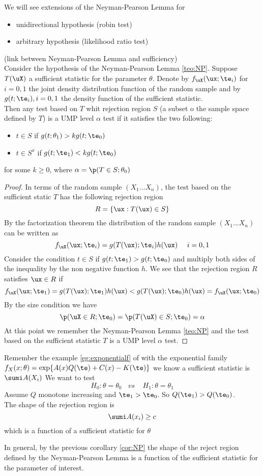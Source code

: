 We will see extensions of the Neyman-Pearson Lemma for
\begin{itemize}
	\item unidirectional hypothesis (robin test)
	\item arbitrary hypothesis (likelihood ratio test)
\end{itemize}
\begin{corol}\label{cor:NP}
	(link between Neyman-Pearson Lemma and sufficiency)\\
	Consider the hypothesis of the Neyman-Pearson Lemma \ref{teo:NP}. Suppose $T(\uX) $ a sufficient statistic for the parameter $\theta$. Denote by $f_{\uX}(\ux; \te_i) $ for $i=0,1$ the joint density distribution function of the random sample and by $g(t;\te_i), i=0,1$ the density function of the sufficient statistic.\\
	Then any test based on $T$ whit rejection region $S$ (a subset o the sample space defined by $T$) is a UMP level  $\alpha$ test if it satisfies the two following:
	\begin{itemize}
		\item $t\in S$ if $g(t;\theta_1)>k g(t;\te_0)$
		\item $t\in S^x$ if $g(t;\te_1)< k g(t; \te_0)$
	\end{itemize}  
	for some $k \geq 0$, where $\alpha = \p(T\in S; \theta_0)$
\end{corol}
\begin{proof}
	In terms of the random sample $(X_1...X_n)$, the test based on the sufficient static  $T$ has the following rejection region $$R=\{\ux : T(\ux) \in S\}$$
	By the factorization theorem the distribution of the random sample  $(X_1...X_n)$ can be written as 
	$$f_{\uX}(\ux;\te_i)=g(T(\ux);\te_i)h(\ux) \ \ \ \ i=0,1$$
	Consider the condition $t\in S$ if $g(t;\te_1)> g(t;\te_0)$ and multiply both sides of the inequality by the non negative function $h$. We see that the rejection region $R$ satisfies $\ux\in R$ if 
	$$f_{\uX}(\ux;\te_1)=g(T(\ux);\te_1)h(\ux)< g(T(\ux);\te_0)h(\ux)=f_{\uX}(\ux;\te_0)$$
	By the size condition we have
	$$	\p (\uX \in R; \te_0)=\p(T(\uX)\in S; \te_0)=\alpha$$
	At this point we remember the Neyman-Pearson Lemma \ref{teo:NP} and the test based on the  sufficient statistic $T$ is a UMP level $\alpha$ test.
\end{proof}
\begin{eg}Remember the example \ref{eg:exponentialf} of with the exponential family
	$f_X(x;\theta)=\exp \{ A(x) Q(\te)+ C(x)- K(\te) \}$ we know a sufficient statistic is $\sumi A(X_i)$
	We want to test 
	$$H_0: \theta= \theta_0 \ \ \ \ vs\ \ \ \ \ H_1: \theta= \theta_1 $$
	Assume $Q$ monotone increasing and $\te_1>\te_0$. So $Q(\te_1)> Q(\te_0)$.\\
	The shape of the rejection region is 
	$$\sumi A(x_i)\geq c$$
	which is a   function of a sufficient statistic for $\theta$
\end{eg}
In general, by the previous corollary \ref{cor:NP} the shape of the reject region defined by the Neyman-Pearson Lemma is a function of the sufficient statistic for the parameter of interest.